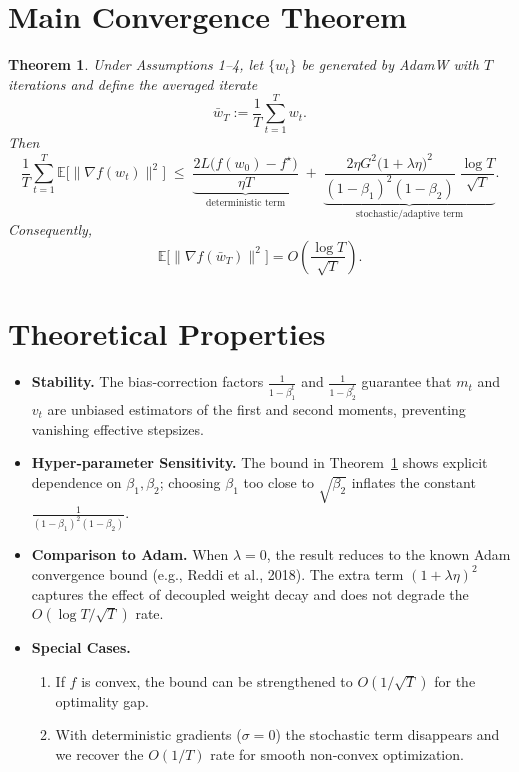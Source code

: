 \documentclass[11pt]{article}
\newtheorem{theorem}{Theorem}
\newcommand{\E}{\mathbb{E}}
\begin{document}
\section*{Main Convergence Theorem}
\begin{theorem}
\label{thm:main}
Under Assumptions 1–4, let $\{w_t\}$ be generated by AdamW with $T$ iterations and define the averaged iterate
\[
\bar w_T:=\frac{1}{T}\sum_{t=1}^{T} w_{t}.
\]
Then
\[
\frac{1}{T}\sum_{t=1}^{T}\E\bigl[\|\nabla f(w_{t})\|^{2}\bigr]\;\le\;
\underbrace{\frac{2L\bigl(f(w_{0})-f^{\star}\bigr)}{\eta T}}_{\text{deterministic term}}
\;+\;
\underbrace{\frac{2\eta G^{2}\bigl(1+\lambda\eta\bigr)^{2}}{(1-\beta_1)^{2}(1-\beta_2)}\;\frac{\log T}{\sqrt{T}}}_{\text{stochastic/adaptive term}}.
\]
Consequently,
\[
\E\bigl[\|\nabla f(\bar w_T)\|^{2}\bigr]=O\!\left(\frac{\log T}{\sqrt{T}}\right).
\]
\end{theorem}

\section*{Theoretical Properties}
\begin{itemize}
\item \textbf{Stability.} The bias‑correction factors $\frac{1}{1-\beta_1^{t}}$ and $\frac{1}{1-\beta_2^{t}}$ guarantee that $m_t$ and $v_t$ are unbiased estimators of the first and second moments, preventing vanishing effective stepsizes.
\item \textbf{Hyper‑parameter Sensitivity.} The bound in Theorem~\ref{thm:main} shows explicit dependence on $\beta_1,\beta_2$; choosing $\beta_1$ too close to $\sqrt{\beta_2}$ inflates the constant $\frac{1}{(1-\beta_1)^{2}(1-\beta_2)}$.
\item \textbf{Comparison to Adam.} When $\lambda=0$, the result reduces to the known Adam convergence bound (e.g., Reddi et al., 2018). The extra term $(1+\lambda\eta)^{2}$ captures the effect of decoupled weight decay and does not degrade the $O(\log T/\sqrt{T})$ rate.
\item \textbf{Special Cases.} 
   \begin{enumerate}
   \item If $f$ is convex, the bound can be strengthened to $O(1/\sqrt{T})$ for the optimality gap.
   \item With deterministic gradients ($\sigma=0$) the stochastic term disappears and we recover the $O(1/T)$ rate for smooth non‑convex optimization.
   \end{enumerate}
\end{itemize}
\end{document}
